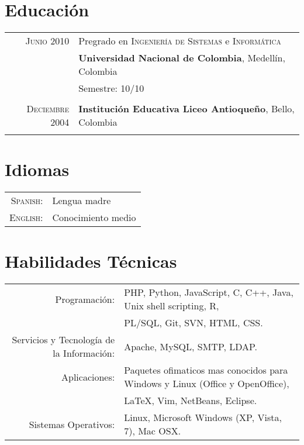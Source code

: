 \documentclass[letter,10pt]{article}
\begin{document}
\section{Educación}
\begin{tabular}{rl}	
\textsc{Junio} 2010 & Pregrado  en \textsc{Ingeniería de Sistemas} e \textsc{Informática}\\
& \textbf{Universidad Nacional de Colombia}, Medellín, Colombia\\
& Semestre: 10/10\\&\\

\textsc{Deciembre} 2004 & \textbf{Institución Educativa Liceo Antioqueño}, Bello, Colombia\\&\\

\end{tabular}


\section{Idiomas}
\begin{tabular}{rl}
 \textsc{Spanish:}&Lengua madre\\
\textsc{English:}&Conocimiento medio\\
\end{tabular}

\section{Habilidades Técnicas}
\begin{tabular}{rl}
 Programación:& PHP, Python, JavaScript, C, C++, Java, Unix shell scripting, R,\\
 & PL/SQL, Git, SVN, HTML, CSS.\\
 Servicios y Tecnología de la Información:& Apache, MySQL, SMTP, LDAP.\\
 Aplicaciones:& Paquetes ofimaticos mas conocidos para Windows y Linux (Office y OpenOffice),\\
 & \LaTeX, Vim, NetBeans, Eclipse.\\
 Sistemas Operativos:& Linux, Microsoft Windows (XP, Vista, 7), Mac OSX.
\end{tabular}
\end{document}
